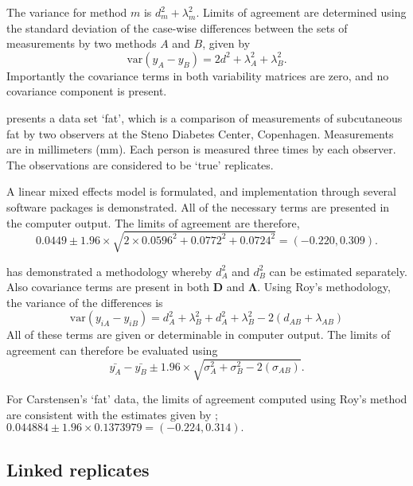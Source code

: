 \documentclass[12pt, a4paper]{article}
\theoremstyle{plain}
\theoremstyle{definition}
\theoremstyle{remark}
\begin{document}
The variance for method $m$ is $d^2_{m}+\lambda^2_{m}$. Limits of agreement are determined using the standard deviation of the case-wise differences between the sets of measurements by two methods $A$ and $B$, given by
\begin{equation}
\mbox{var} (y_{A}-y_{B}) = 2d^2 + \lambda^2_{A}+ \lambda^2_{B}.
\end{equation}
Importantly the covariance terms in both variability matrices are zero, and no covariance component is present.

\citet{BXC2008} presents a data set `fat', which is a comparison of measurements of subcutaneous fat
by two observers at the Steno Diabetes Center, Copenhagen. Measurements are in millimeters
(mm). Each person is measured three times by each observer. The observations are considered to be `true' replicates.

A linear mixed effects model is formulated, and implementation through several software packages is demonstrated.
All of the necessary terms are presented in the computer output. The limits of agreement are therefore,
\begin{equation}
0.0449  \pm 1.96 \times  \sqrt{2 \times 0.0596^2 + 0.0772^2 + 0.0724^2} = (-0.220,  0.309).
\end{equation}

\citet{roy} has demonstrated a methodology whereby $d^2_{A}$ and $d^2_{B}$ can be estimated separately. Also covariance terms are present in both $\boldsymbol{D}$ and $\boldsymbol{\Lambda}$. Using Roy's methodology, the variance of the differences is
\begin{equation}
\mbox{var} (y_{iA}-y_{iB})= d^2_{A} + \lambda^2_{B} + d^2_{A} + \lambda^2_{B} - 2(d_{AB} + \lambda_{AB})
\end{equation}
All of these terms are given or determinable in computer output.
The limits of agreement can therefore be evaluated using
\begin{equation}
\bar{y_{A}}-\bar{y_{B}} \pm 1.96 \times \sqrt{ \sigma^2_{A} + \sigma^2_{B}  - 2(\sigma_{AB})}.
\end{equation}

For Carstensen's `fat' data, the limits of agreement computed using Roy's
method are consistent with the estimates given by \citet{BXC2008}; $0.044884  \pm 1.96 \times  0.1373979 = (-0.224,  0.314).$

\subsection{Linked replicates}
\end{document}
